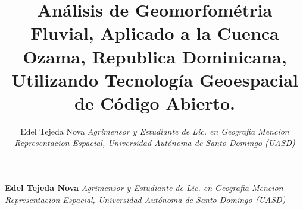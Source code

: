 \documentclass[11pt,]{article}
\title{Análisis de Geomorfométria Fluvial, Aplicado a la Cuenca Ozama,
Republica Dominicana, Utilizando Tecnología Geoespacial de Código
Abierto.  }
\author{\Large Edel Tejeda Nova\vspace{0.05in} \newline\normalsize\emph{Agrimensor y Estudiante de Lic. en Geografia Mencion Representacion
Espacial, Universidad Autónoma de Santo Domingo (UASD)}  }
\date{}
\newcommand*{\authorfont}{\fontfamily{phv}\selectfont}
\begin{document}
	
%

{%
\setlength{\parindent}{0pt}
\thispagestyle{plain}
{\fontsize{18}{20}\selectfont\raggedright 
\maketitle  %

}

{
   \vskip 13.5pt\relax \normalsize\fontsize{11}{12} 
\textbf{\authorfont Edel Tejeda Nova} \hskip 15pt \emph{\small Agrimensor y Estudiante de Lic. en Geografia Mencion Representacion
Espacial, Universidad Autónoma de Santo Domingo (UASD)}   

}

}
\end{document}
